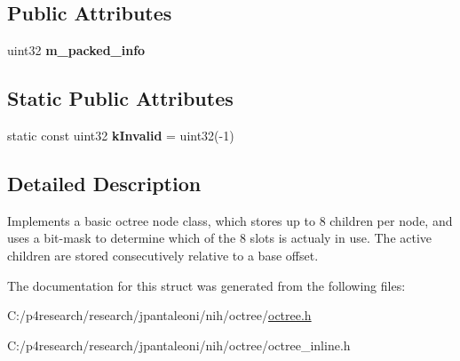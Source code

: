 \subsection*{\-Public \-Attributes}
\begin{DoxyCompactItemize}
\item 
\hypertarget{structnih_1_1_octree__node_adb5dd3768d479000e839e9848c66ad61}{
uint32 {\bfseries m\-\_\-packed\-\_\-info}}
\label{structnih_1_1_octree__node_adb5dd3768d479000e839e9848c66ad61}

\end{DoxyCompactItemize}
\subsection*{\-Static \-Public \-Attributes}
\begin{DoxyCompactItemize}
\item 
\hypertarget{structnih_1_1_octree__node_a494589b13a167062892181937e2203c4}{
static const uint32 {\bfseries k\-Invalid} = uint32(-\/1)}
\label{structnih_1_1_octree__node_a494589b13a167062892181937e2203c4}

\end{DoxyCompactItemize}


\subsection{\-Detailed \-Description}
\-Implements a basic octree node class, which stores up to 8 children per node, and uses a bit-\/mask to determine which of the 8 slots is actualy in use. \-The active children are stored consecutively relative to a base offset. 

\-The documentation for this struct was generated from the following files\-:\begin{DoxyCompactItemize}
\item 
\-C\-:/p4research/research/jpantaleoni/nih/octree/\hyperlink{octree_8h}{octree.\-h}\item 
\-C\-:/p4research/research/jpantaleoni/nih/octree/octree\-\_\-inline.\-h\end{DoxyCompactItemize}
